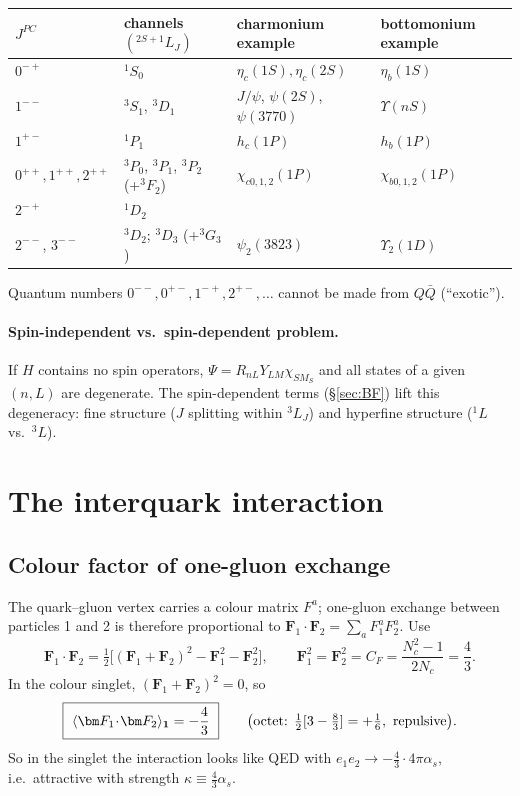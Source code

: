 \documentclass[11pt,a4paper]{article}
\numberwithin{equation}{section}
\theoremstyle{definition}
\theoremstyle{plain}
\theoremstyle{remark}
\numberwithin{algorithm}{section}
\newcommand{\vF}{\bm F}
\newcommand{\as}{\alpha_s}
\begin{document}
\begin{center}\small
\begin{tabular}{@{}llll@{}}
\toprule
$J^{PC}$ & channels $(^{2S+1}L_J)$ & charmonium example & bottomonium example\\ \midrule
$0^{-+}$ & ${}^1S_0$ & $\eta_c(1S),\eta_c(2S)$ & $\eta_b(1S)$ \\
$1^{--}$ & ${}^3S_1$, ${}^3D_1$ & $J/\psi$, $\psi(2S)$, $\psi(3770)$ & $\Upsilon(nS)$ \\
$1^{+-}$ & ${}^1P_1$ & $h_c(1P)$ & $h_b(1P)$ \\
$0^{++},1^{++},2^{++}$ & ${}^3P_0$, ${}^3P_1$, ${}^3P_2$ (+${}^3F_2$) & $\chi_{c0,1,2}(1P)$ & $\chi_{b0,1,2}(1P)$\\
$2^{-+}$ & ${}^1D_2$ & & \\
$2^{--}$, $3^{--}$ & ${}^3D_2$; ${}^3D_3$ (+${}^3G_3$) & $\psi_2(3823)$ & $\Upsilon_2(1D)$ \\ \bottomrule
\end{tabular}
\end{center}
Quantum numbers $0^{--},0^{+-},1^{-+},2^{+-},\dots$ cannot be made from $Q\bar Q$ (``exotic'').

\paragraph{Spin-independent vs.\ spin-dependent problem.} If $H$ contains no spin operators, $\Psi=R_{nL}Y_{LM}\chi_{SM_S}$ and all states of a given $(n,L)$ are degenerate. The spin-dependent terms (\S\ref{sec:BF}) lift this degeneracy: fine structure ($J$ splitting within ${}^3L_J$) and hyperfine structure (${}^1L$ vs.\ ${}^3L$).
\section{The interquark interaction}\label{sec:potential}

\subsection{Colour factor of one-gluon exchange}\label{sec:colour}
The quark--gluon vertex carries a colour matrix $F^a$; one-gluon exchange between particles 1 and 2 is therefore proportional to $\vF_1\!\cdot\!\vF_2=\sum_aF_1^aF_2^a$. Use
\begin{equation}
\vF_1\!\cdot\!\vF_2=\tfrac12\Big[(\vF_1+\vF_2)^2-\vF_1^2-\vF_2^2\Big],\qquad
\vF_1^2=\vF_2^2=C_F=\frac{N_c^2-1}{2N_c}=\frac43 .
\end{equation}
In the colour singlet, $(\vF_1+\vF_2)^2=0$, so
\begin{equation}
\boxed{\ \langle\vF_1\!\cdot\!\vF_2\rangle_{\bf 1}=-\frac43\ }\qquad\big(\text{octet: }\tfrac12[3-\tfrac83]=+\tfrac16,\ \text{repulsive}\big).
\end{equation}
So in the singlet the interaction looks like QED with $e_1e_2\to-\tfrac43\cdot4\pi\as$, i.e.\ attractive with strength $\kappa\equiv\tfrac43\as$.
\end{document}
